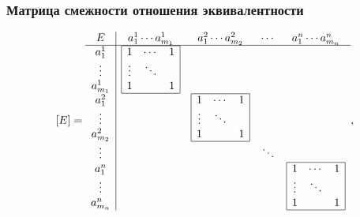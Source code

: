 \begin{frame}
    \frametitle{Матрица смежности отношения эквивалентности}
    
    \[[E]=
        \begin{array}{c|cccc}
            E
                &a^1_1\cdots a^1_{m_1} 
                    & a^2_1\cdots a^2_{m_2} 
                        & \cdots 
                            & a^n_1\cdots a^n_{m_n}
                                \\ 
            \hline
            \begin{matrix}a^1_1\\ \vdots \\ a^1_{m_1}\end{matrix} 
                &\begin{array}{|ccc|}\hline 1&\cdots&1\\ \vdots & \ddots & \\ 1 & & 1\\ \hline\end{array}
                    &
                        &
                            &
                                \\
            \begin{matrix}a^2_1\\ \vdots \\ a^2_{m_2}\end{matrix} 
                &
                    &\begin{array}{|ccc|}\hline 1&\cdots&1\\ \vdots & \ddots & \\ 1 & & 1\\ \hline\end{array}
                        &
                            & 
                                \\
            \vdots
                &
                    &
                        &\ddots
                            & 
                                \\
            \begin{matrix}a^n_1\\ \vdots \\ a^n_{m_n}\end{matrix} 
                &
                    &
                        &
                            &\begin{array}{|ccc|}\hline 1&\cdots&1\\ \vdots & \ddots & \\ 1 & & 1\\ \hline\end{array}
        \end{array},
    \]
\end{frame}

